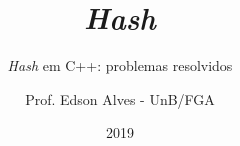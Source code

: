 \title{\textit{Hash}}
\subtitle{\textit{Hash} em C++: problemas resolvidos}
\author{Prof. Edson Alves - UnB/FGA}
\date{2019}
